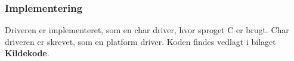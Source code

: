 \documentclass[Rapport/RPi/RPI.tex]{subfiles}
\begin{document}
\subsubsection{Implementering}\label{sec:I2C_interruptDriver_implementering}
Driveren er implementeret, som en char driver, hvor sproget C er brugt. Char driveren er skrevet, som en platform driver. Koden findes vedlagt i bilaget \textbf{Kildekode}.
\end{document}
